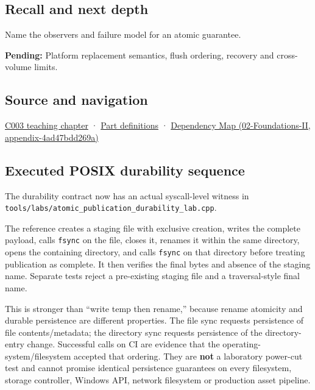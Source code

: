 \subsection{Recall and next depth}\label{appendix-e89a8f290ef5-recall-and-next-depth}

Name the observers and failure model for an atomic guarantee.

\textbf{Pending:} Platform replacement semantics, flush ordering, recovery and cross-volume limits.

\subsection{Source and navigation}\label{appendix-e89a8f290ef5-source-and-navigation}

\hyperref[01-foundations-i-ch002-where-the-bytes-live]{C003 teaching chapter} · \hyperref[appendix-fd090d982a15-m003---parts-41-60]{Part definitions} · \href{../02-Foundations-II/main.pdf\#nameddest=appendix-4ad47bdd269a}{Dependency Map (02-Foundations-II, appendix-4ad47bdd269a)}

\subsection{Executed POSIX durability sequence}\label{appendix-e89a8f290ef5-executed-posix-durability-sequence}

The durability contract now has an actual syscall-level witness in \texttt{tools/labs/atomic\_publication\_durability\_lab.cpp}.

The reference creates a staging file with exclusive creation, writes the complete payload, calls \texttt{fsync} on the file, closes it, renames it within the same directory, opens the containing directory, and calls \texttt{fsync} on that directory before treating publication as complete. It then verifies the final bytes and absence of the staging name. Separate tests reject a pre-existing staging file and a traversal-style final name.

This is stronger than ``write temp then rename,'' because rename atomicity and durable persistence are different properties. The file sync requests persistence of file contents/metadata; the directory sync requests persistence of the directory-entry change. Successful calls on CI are evidence that the operating-system/filesystem accepted that ordering. They are \textbf{not} a laboratory power-cut test and cannot promise identical persistence guarantees on every filesystem, storage controller, Windows API, network filesystem or production asset pipeline.
